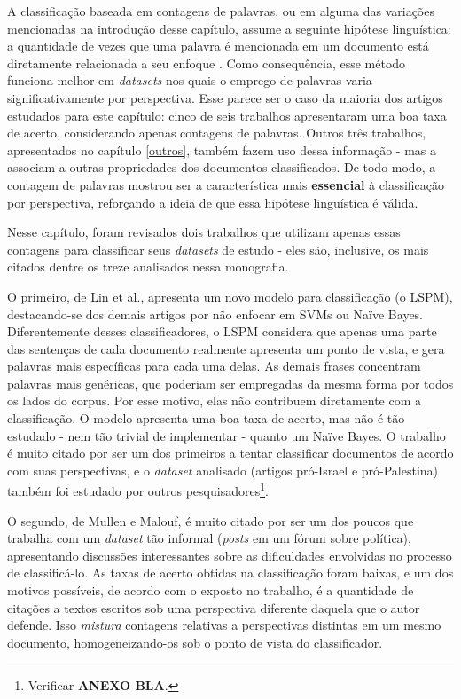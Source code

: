 A classificação baseada em contagens de palavras, ou em alguma das variações mencionadas na introdução desse capítulo, assume a seguinte hipótese linguística: a quantidade de vezes que uma palavra é mencionada em um documento está diretamente relacionada a seu enfoque \cite{teubert}. Como consequência, esse método funciona melhor em \emph{datasets} nos quais o emprego de palavras varia significativamente por perspectiva. Esse parece ser o caso da maioria dos artigos estudados para este capítulo: cinco de seis trabalhos apresentaram uma boa taxa de acerto, considerando apenas contagens de palavras. Outros três trabalhos, apresentados no capítulo \ref{outros}, também fazem uso dessa informação - mas a associam a outras propriedades dos documentos classificados. De todo modo, a contagem de palavras mostrou ser a característica mais \textbf{essencial} à classificação por perspectiva, reforçando a ideia de que essa hipótese linguística é válida.


Nesse capítulo, foram revisados dois trabalhos que utilizam apenas essas contagens para classificar seus \emph{datasets} de estudo - eles são, inclusive, os mais citados dentre os treze analisados nessa monografia.

O primeiro, de Lin et al., apresenta um novo modelo para classificação (o LSPM), destacando-se dos demais artigos por não enfocar em SVMs ou Naïve Bayes. Diferentemente desses classificadores, o LSPM considera que apenas uma parte das sentenças de cada documento realmente apresenta um ponto de vista, e gera palavras mais específicas para cada uma delas. As demais frases concentram palavras mais genéricas, que poderiam ser empregadas da mesma forma por todos os lados do corpus. Por esse motivo, elas não contribuem diretamente com a classificação. O modelo apresenta uma boa taxa de acerto, mas não é tão estudado - nem tão trivial de implementar - quanto um Naïve Bayes. O trabalho é muito citado por ser um dos primeiros a tentar classificar documentos de acordo com suas perspectivas, e o \emph{dataset} analisado (artigos pró-Israel e pró-Palestina) também foi estudado por outros pesquisadores\footnote{Verificar \textbf{ANEXO BLA}.}.

O segundo, de Mullen e Malouf, é muito citado por ser um dos poucos que trabalha com um \emph{dataset} tão informal (\emph{posts} em um fórum sobre política), apresentando discussões interessantes sobre as dificuldades envolvidas no processo de classificá-lo. As taxas de acerto obtidas na classificação foram baixas, e um dos motivos possíveis, de acordo com o exposto no trabalho, é a quantidade de citações a textos escritos sob uma perspectiva diferente daquela que o autor defende. Isso \emph{mistura} contagens relativas a perspectivas distintas em um mesmo documento, homogeneizando-os sob o ponto de vista do classificador. 

